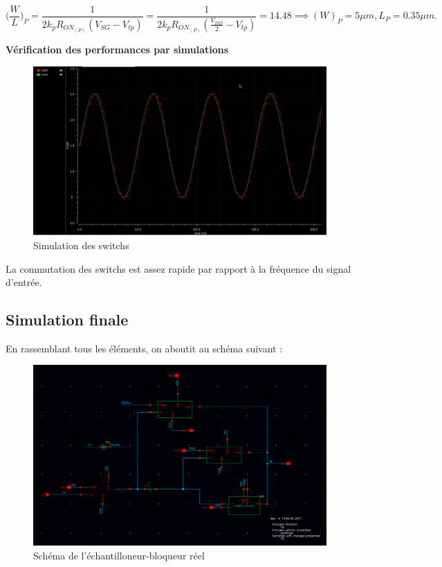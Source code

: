 \documentclass[11pt]{article}
\begin{document}
\[
\bigg(\frac{W}{L}\bigg)_{P} = \frac{1}{2k_p R_{ON_{(P)}}  (V_{SG} - V_{tp})} = \frac{1}{2k_p R_{ON_{(P)}}  (\frac{V_{DD}}{2} - V_{tp})} = 14.48 \implies (W)_{P} = 5 \mu m,  L_{P} = 0.35 \mu m.
\]

\textbf{V\'erification des performances par simulations}

\begin{figure}[!htb]
\begin{center}
  \includegraphics[width=0.8\linewidth]{switchs_simu.png}
  \caption{Simulation des switchs}
\end{center}
\end{figure}

La commutation des switchs est assez rapide par rapport \`a la fr\'equence du signal d'entr\'ee.

\clearpage

\subsection{Simulation finale}
En rassemblant tous les \'el\'ements, on aboutit au sch\'ema suivant :

\begin{figure}[!htb]
\begin{center}
  \includegraphics[width=0.80\linewidth]{EB-Schematic.png}
  \caption{Sch\'ema de l'\'echantilloneur-bloqueur r\'eel}
\end{center}
\end{figure}
\end{document}
